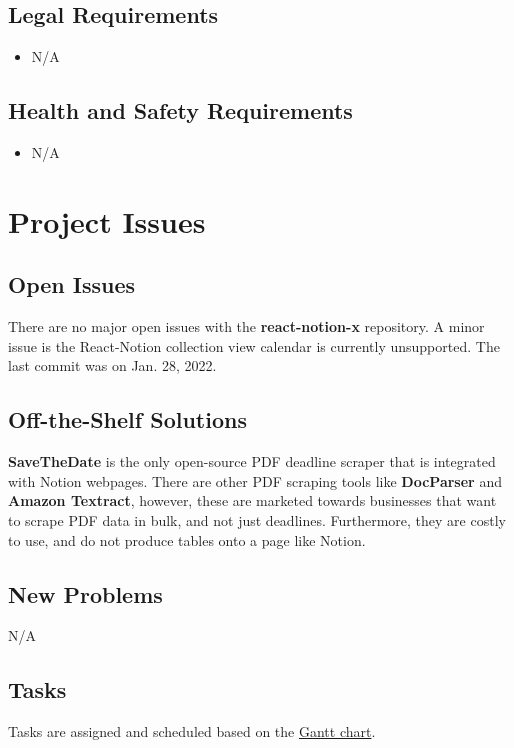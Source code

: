 \documentclass[12pt, titlepage]{article}
\begin{document}
\subsection{Legal Requirements}

\begin{itemize}
  \item[] N/A
\end{itemize}

\subsection{Health and Safety Requirements}

\begin{itemize}
  \item[] N/A
\end{itemize}

\section{Project Issues}

\subsection{Open Issues}
There are no major open issues with the \textbf{react-notion-x} repository. A minor issue is the React-Notion collection view calendar is currently unsupported. The last commit was on Jan. 28, 2022.

\subsection{Off-the-Shelf Solutions}
\textbf{SaveTheDate} is the only open-source PDF deadline scraper that is integrated with Notion webpages. There are other PDF scraping tools like \textbf{DocParser} and 
\textbf{Amazon Textract}, however, these are marketed towards businesses that want to scrape PDF data in bulk, and not just deadlines. Furthermore, they are costly to use, and do not produce tables onto a page like Notion.

\subsection{New Problems}
N/A

\subsection{Tasks}
Tasks are assigned and scheduled based on the \href{https://gitlab.cas.mcmaster.ca/se3xa3_l03_g17/se3xa3_l03_g17/-/blob/main/ProjectSchedule/3XA3_L03_G17_GanttChart.pdf}{Gantt chart}.
\end{document}
